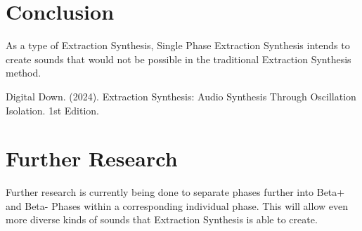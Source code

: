 \documentclass[12pt,a4paper]{article}
\begin{document}
\section{Conclusion}
As a type of Extraction Synthesis, Single Phase Extraction Synthesis intends to create sounds that would not be possible in the traditional Extraction Synthesis method. 

\begin{thebibliography}{9}
 Digital Down. (2024). Extraction Synthesis: Audio Synthesis Through Oscillation Isolation. 1st Edition.
\end{thebibliography}



\section*{Further Research}
Further research is currently being done to separate phases further into Beta+ and Beta- Phases within a corresponding individual phase. This will allow even more diverse kinds of sounds that Extraction Synthesis is able to create.
\end{document}
